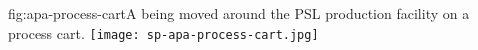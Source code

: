 \begin{dunefigure}{fig:apa-process-cart}{A   being moved around the PSL production facility on a process cart. 
}
\texttt{[image: sp-apa-process-cart.jpg]}
\end{dunefigure}

%




